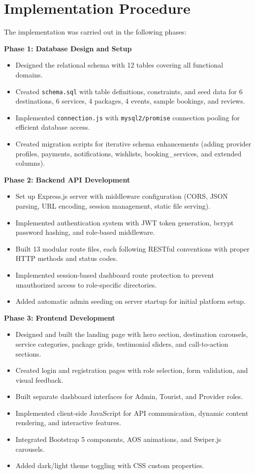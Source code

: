 \section{Implementation Procedure}

The implementation was carried out in the following phases:

\textbf{Phase 1: Database Design and Setup}
\begin{itemize}[leftmargin=2em]
    \item Designed the relational schema with 12 tables covering all functional domains.
    \item Created \texttt{schema.sql} with table definitions, constraints, and seed data for 6 destinations, 6 services, 4 packages, 4 events, sample bookings, and reviews.
    \item Implemented \texttt{connection.js} with \texttt{mysql2/promise} connection pooling for efficient database access.
    \item Created migration scripts for iterative schema enhancements (adding provider profiles, payments, notifications, wishlists, booking\_services, and extended columns).
\end{itemize}

\textbf{Phase 2: Backend API Development}
\begin{itemize}[leftmargin=2em]
    \item Set up Express.js server with middleware configuration (CORS, JSON parsing, URL encoding, session management, static file serving).
    \item Implemented authentication system with JWT token generation, bcrypt password hashing, and role-based middleware.
    \item Built 13 modular route files, each following RESTful conventions with proper HTTP methods and status codes.
    \item Implemented session-based dashboard route protection to prevent unauthorized access to role-specific directories.
    \item Added automatic admin seeding on server startup for initial platform setup.
\end{itemize}

\textbf{Phase 3: Frontend Development}
\begin{itemize}[leftmargin=2em]
    \item Designed and built the landing page with hero section, destination carousels, service categories, package grids, testimonial sliders, and call-to-action sections.
    \item Created login and registration pages with role selection, form validation, and visual feedback.
    \item Built separate dashboard interfaces for Admin, Tourist, and Provider roles.
    \item Implemented client-side JavaScript for API communication, dynamic content rendering, and interactive features.
    \item Integrated Bootstrap 5 components, AOS animations, and Swiper.js carousels.
    \item Added dark/light theme toggling with CSS custom properties.
\end{itemize}

